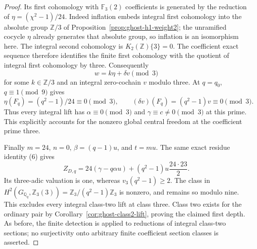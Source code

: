 \begin{proof}
Its first cohomology with \(\mathbb F_3(2)\)
coefficients is generated by the reduction of
\(\eta=(\chi^2-1)/24\). Indeed inflation embeds
integral first cohomology into the absolute group
\(\mathbb Z/3\) of
Proposition~\ref{prop:ghost-h1-weight2}; the unramified
cocycle \(\eta\) already generates that absolute
group, so inflation is an isomorphism here.
The integral second cohomology is
\(K_2(\mathbb Z)\{3\}=0\). The coefficient exact
sequence therefore identifies the finite first
cohomology with the quotient of integral first
cohomology by three. Consequently
\[
                    w=k\eta+\delta v\pmod3
\]
for some \(k\in\mathbb Z/3\) and an integral
zero-cochain \(v\) modulo three.
At \(q=q_0\), \(q\equiv1\pmod9\) gives
\[
 \eta(F_q)=(q^2-1)/24\equiv0\pmod3,
 \qquad (\delta v)(F_q)=(q^2-1)v\equiv0\pmod3.
\]
Thus every integral lift has
\(\alpha\equiv0\pmod3\) and
\(\gamma\equiv c\ne0\pmod3\) at this prime.
This explicitly accounts for the nonzero global
central freedom at the coefficient prime three.

Finally \(m=24\), \(n=0\), \(\beta=(q-1)u\),
and \(t=mu\). The same exact residue identity (6)
gives
\[
 Z_{D,q}=24(\gamma-q\alpha u)
                +(q^2-1)u\frac{24\cdot23}{2}.
\]
Its three-adic valuation is one, whereas
\(v_3(q^2-1)\ge2\). The class in
\(H^2(G_{\mathbb Q_q},\mathbb Z_3(3))
=\mathbb Z_3/(q^2-1)\mathbb Z_3\)
is nonzero, and remains so modulo nine. This excludes
every integral class-two lift at class three.
Class two exists for the ordinary pair by
Corollary~\ref{cor:ghost-class2-lift}, proving the
claimed first depth. As before, the finite detection
is applied to reductions of integral class-two
sections; no surjectivity onto arbitrary finite
coefficient section classes is asserted.
\end{proof}
